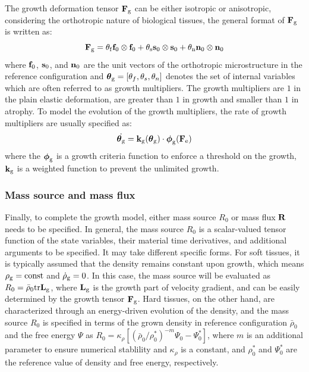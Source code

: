 The growth deformation tensor $\bold{F}_{\mathrm{g}}$ can be either isotropic or anisotropic, considering the orthotropic nature of biological tissues, the general format of $\bold{F}_{\mathrm{g}}$ is written as:
\begin{equation}
\bold{F}_{\mathrm{g}} = \theta_{\mathrm{f}} \bold{f}_0 \otimes \bold{f}_0 + \theta_{\mathrm{s}}  \bold{s}_0 \otimes \bold{s}_0  + \theta_{\mathrm{n}}  \bold{n}_0 \otimes \bold{n}_0
\end{equation}
where $\bold{f}_0$, $\bold{s}_0$, and $\bold{n}_0$ are the unit vectors of the orthotropic microstructure in the reference configuration and $\boldsymbol\theta_{\mathrm{g}} = [\theta_f, \theta_s, \theta_n]$ denotes the set of internal variables which are often referred to as growth multipliers. The growth multipliers are $1$ in the plain elastic deformation, are greater than $1$ in growth and smaller than $1$ in atrophy. To model the evolution of the growth multipliers, the rate of growth multipliers are usually specified as:
\begin{equation} \label{eq:stretchRatio}
\dot{\boldsymbol\theta_{\mathrm{g}}} = \bold k_{\mathrm{g}}(\boldsymbol\theta_{\mathrm{g}}) \cdot \boldsymbol \phi_{\mathrm{g}}(\bold{F}_{\mathrm{e}})
\end{equation}
where the $\boldsymbol\phi_{\mathrm{g}}$ is a growth criteria function to enforce a threshold on the growth, $\bold k_{\mathrm{g}}$ is a weighted function to prevent the unlimited growth.

\subsubsection{Mass source and mass flux}
Finally, to complete the growth model, either mass source $R_0$ or mass flux $\bold{R}$ needs to be specified. In general, the mass source $R_0$ is a scalar-valued tensor function of the state variables, their material time derivatives, and additional arguments to be specified. It may take different specific forms. For soft tissues, it is typically assumed that the density remains constant upon growth, which means $\rho_{\mathrm{g}} = \mathrm{const}$ and $\dot\rho_{\mathrm{g}} = 0$. In this case, the mass source will be evaluated as $R_0 = \bar{\rho}_0\mathrm{tr}\bold{L}_{\mathrm{g}}$, where $\bold{L}_{\mathrm{g}}$ is the growth part of velocity gradient, and can be easily determined by the growth tensor $\bold{F}_{\mathrm{g}}$. Hard tissues, on the other hand, are characterized through an energy-driven evolution of the density, and the mass source $R_0$ is specified in terms of the grown density in reference configuration ${\bar\rho}_0$ and the free energy $\Psi$ as $R_0 = \kappa_\rho[ ( {\bar\rho}_0/{\rho_0^*} )^{-m}\Psi_0 - \Psi_0^* ]$, where $m$ is an additional parameter to ensure numerical stablility and $\kappa_\rho$ is a constant, and $\rho_0^*$ and $\Psi_0^*$ are the reference value of density and free energy, respectively.

